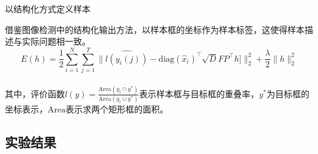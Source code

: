 \begin{frame}{以结构化方式定义样本}

借鉴图像检测中的结构化输出方法，以样本框的坐标作为样本标签，这使得样本描述与实际问题相一致。
~\\
\begin{equation}
E(h)= \frac{1}{2}\sum_{i=1}^N\sum_{j=1}^T\|\widehat{l(y_i(j))}-\mathrm{diag}(\hat{x}_i)^\top\sqrt{D}FP^\top h]\|_2^2 + \frac{\lambda}{2}\|h\|_2^2
    \label{eq:CFwLB_MOSSEwithMaskingMatixInFourierStructuredOutput}
\end{equation}
~\\
其中，评价函数$l(y)=\frac{\mathrm{Area}(y_i\cap y^\ast)}{\mathrm{Area}(y_i\cup y^\ast)}$表示样本框与目标框的重叠率，$y^\ast$为目标框的坐标表示，$\mathrm{Area}$表示求两个矩形框的面积。
\end{frame}

\subsection{实验结果}



